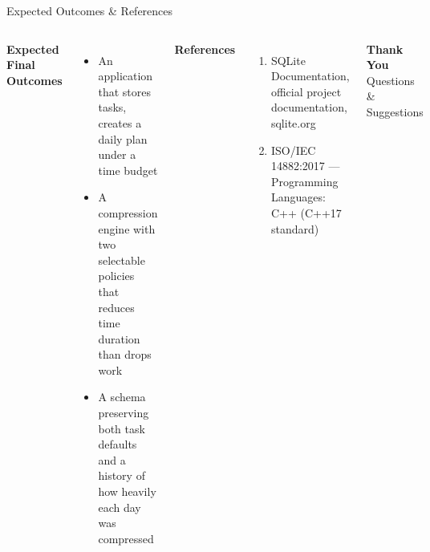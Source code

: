 \documentclass[aspectratio=169,11pt]{beamer}
\begin{document}
\begin{frame}{Expected Outcomes \& References}

\begin{columns}[T,totalwidth=\textwidth]


\textbf{\color{GEUBlue}Expected Final Outcomes}

\begin{itemize}\itemsep
\scriptsize
\item An application that stores tasks, creates a daily plan under a time budget 
\item A compression engine with two selectable policies that reduces time duration than drops work 
\item A schema preserving both task defaults and a history of how
 heavily each day was compressed
\end{itemize}


\textbf{\color{GEUBlue}References}

\begin{enumerate}\itemsep3pt
\scriptsize
\item SQLite Documentation, official project documentation, sqlite.org
\item ISO/IEC 14882:2017 --- Programming Languages: C++ (C++17 standard)
\end{enumerate}

\vspace{2mm}

\begin{center}

\colorbox{GEUBlue}{
\parbox{.78\textwidth}{
\centering
\color{white}
\textbf{Thank You}\\
Questions \& Suggestions
}}

\end{center}

\end{columns}

\vfill


\end{frame}
\end{document}
